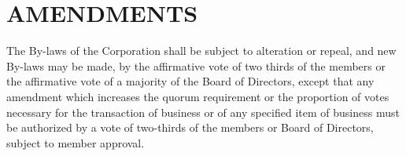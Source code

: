 \documentclass{article}
\begin{document}
\section{AMENDMENTS}
The By-laws of the Corporation shall be subject to alteration or repeal, and new By-laws may be made, by the affirmative vote of two thirds of the members or the affirmative vote of a majority of the Board of Directors, except that any amendment which increases the quorum requirement or the proportion of votes necessary for the transaction of business or of any specified item of business must be authorized by a vote of two-thirds of the members or Board of Directors, subject to member approval.
\end{document}
